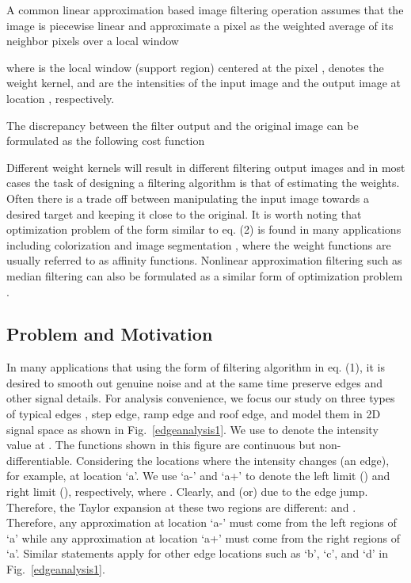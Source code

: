 \documentclass[10pt,twocolumn,letterpaper]{article}
\begin{document}
A common linear approximation based image filtering operation assumes that the image is piecewise linear and approximate a pixel as the weighted average of its neighbor pixels over a local window 

where  is the local window (support region) centered at the pixel ,  denotes the weight kernel,  and  are the intensities of the input image  and the output image  at location , respectively. 

The discrepancy between the filter output and the original image can be formulated as the following cost function

Different weight kernels will result in different filtering output images and in most cases the task of designing a filtering algorithm is that of estimating the weights. Often there is a trade off between manipulating the input image towards a desired target and keeping it close to the original. It is worth noting that optimization problem of the form similar to eq. (2) is found in many applications including colorization \cite{colorization}\cite{colorizationofqiu} and image segmentation \cite{seg1}\cite{seg2}, where the weight functions are usually referred to as affinity functions. Nonlinear approximation filtering such as median filtering can also be formulated as a similar form of optimization problem \cite{med1}. 

\subsection{Problem and Motivation}
In many applications that using the form of filtering algorithm in eq. (1), it is desired to smooth out genuine noise and at the same time preserve edges and other signal details.  For analysis convenience, we focus our study on three types of typical edges \cite{cie}, step edge, ramp edge and roof edge, and model them in 2D signal space as shown in Fig.~\ref{edgeanalysis1}. We use  to denote the intensity value at . The functions  shown in this figure are continuous but non-differentiable. Considering the locations where the intensity changes (an edge), for example, at location `a'. We use `a-' and `a+' to denote the left limit () and right limit (), respectively, where . Clearly,  and (or)  due to the edge jump. Therefore, the Taylor expansion at these two regions are different:  and . Therefore, any approximation at location `a-' must come from the left regions of `a' while any approximation at location `a+' must come from the right regions of `a'. Similar statements apply for other edge locations such as `b', `c', and `d' in Fig.~\ref{edgeanalysis1}.
\end{document}
